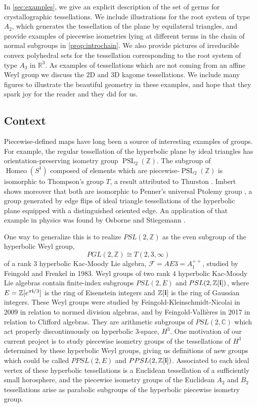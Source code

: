 \documentclass[11pt]{amsart}
\def\C{{\mathbb C}}
\def\R{\mathbb{R}}
\def\Z{\mathbb{Z}}
\def\bi{{\bf i}}
\def\cF{\mathcal F}
\numberwithin{table}{section}
\numberwithin{figure}{section}
\theoremstyle{remark}
\DeclareMathOperator{\PSL}{PSL}
\begin{document}
In \cref{sec:examples}, we give an explicit description of the set
of germs for crystallographic tessellations. We include illustrations
for the root system of type $A_2$, which generates the tessellation of
the plane by equilateral triangles, and provide examples of piecewise
isometries lying at different terms in the chain of normal subgroups
in \cref{prop:introchain}. We also provide pictures of irreducible
convex polyhedral sets for the tessellation corresponding to the root
system of type $A_3$ in $\R^3$. As examples of tessellations which are
not coming from an affine Weyl group we discuss the 2D and 3D kagome
tessellations. We include many figures to illustrate the beautiful
geometry in these examples, and hope that they spark joy for the reader
and they did for us.


\subsection{Context}

Piecewise-defined maps have long been a source of interesting examples
of groups. For example, the regular tessellation of the hyperbolic
plane by ideal triangles has orientation-preserving isometry group
$\PSL_2(\Z)$. The subgroup of $\operatorname{Homeo}(S^1)$ composed of
elements which are piecewise-$\PSL_2(\Z)$ is isomorphic to Thompson's
group $T$, a result attributed to Thurston \cite{Greenberg90}. Imbert
shows moreover that both are isomorphic to Penner's universal Ptolemy
group \cite{Imbert97,Penner}, a group generated by edge flips of ideal
triangle tessellations of the hyperbolic plane equipped with a
distinguished oriented edge. An application of that example in physics
was found by Osborne and Stiegemann \cite{OS_2020}.

One way to generalize this is to realize $PSL(2,\Z)$ as the even
subgroup of the hyperbolic Weyl group,
$$PGL(2,\Z)\cong T(2,3,\infty)$$
of a rank $3$ hyperbolic Kac-Moody Lie algebra,
$\cF = AE3 = A_1^{++}$, studied by Feingold and Frenkel \cite{FeFr83}
in 1983. Weyl groups of two rank $4$ hyperbolic Kac-Moody Lie algebras
contain finite-index subgroups $PSL(2,E)$ and $PSL(2,\Z[\bi])$, where
$E = \Z[e^{\pi\bi/3}]$ is the ring of Eisenstein integers and
$\Z[\bi]$ is the ring of Gaussian integers.  These Weyl groups were
studied by Feingold-Kleinschmidt-Nicolai
\cite{FeKlNi09,FeKlNi09a,FeKlNi09b} in 2009 in relation to normed
division algebras, and by Feingold-Valli\`eres \cite{FV18} in 2017 in
relation to Clifford algebras.  They are arithmetic subgroups of
$PSL(2,\C)$ which act properly discontinuously on hyperbolic
$3$-space, $H^3$. One motivation of our current project is to study
piecewise isometry groups of the tessellations of $H^3$ determined by
these hyperbolic Weyl groups, giving us definitions of new groups
which could be called $PPSL(2,E)$ and $PPSL(2,\Z[\bi])$. Associated to
each ideal vertex of these hyperbolic tessellations is a Euclidean
tessellation of a sufficiently small horosphere, and the piecewise
isometry groups of the Euclidean $A_2$ and $B_2$ tessellations arise
as parabolic subgroups of the hyperbolic piecewise isometry group.
\end{document}
